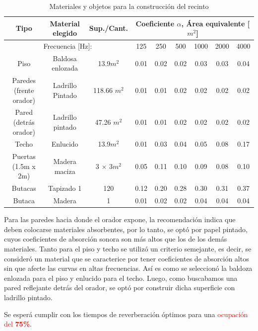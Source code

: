 \begin{table}[h]
    \centering
    \begin{tabular}{|c|c|c||c|c|c|c|c|c|} \hline
        Tipo &  Material elegido &Sup./Cant. & \multicolumn{6}{|c|}{Coeficiente $\alpha$, Área equivalente [$m^2$]} \\ \hline
        \multicolumn{3}{|c|}{Frecuencia [Hz]:} & 125 & 250 & 500 & 1000 & 2000 & 4000 \\ \hline \hline
        Piso & Baldosa enlozada & 13.9$m^2$ & 0.01 & 0.02 & 0.02 & 0.03 & 0.03 & 0.04 \\ \hline
        Paredes (frente orador) & Ladrillo Pintado & 118.66 $m^2$ & 0.01 & 0.01 & 0.02 & 0.02 & 0.02 & 0.02 \\ \hline
        Pared (detrás orador) & Ladrillo pintado & 47.26 $m^2$ & 0.01 & 0.01 & 0.02 & 0.02 & 0.02 & 0.02 \\ \hline
        Techo & Enlucido &13.9$m^2$ & 0.01 & 0.03 & 0.04 & 0.05 & 0.08 & 0.17 \\ \hline
        Puertas (1.5m x 2m) & Madera maciza & 3 $\times$ 3$m^2$ & 0.05 & 0.11 & 0.10 & 0.09 & 0.08 &  0.10 \\ \hline \hline
        Butacas & Tapizado 1 & 120 & 0.12 & 0.20 & 0.28 & 0.30 & 0.31 & 0.37 \\ \hline
        Butaca & Madera & 1 & 0.01 & 0.02 & 0.02 & 0.04 & 0.04 & 0.04 \\ \hline
    \end{tabular}
    \caption{Materiales y objetos para la construcción del recinto}
    \label{tab:materiales_construccion_recinto}
\end{table}

\par Para las paredes hacia donde el orador expone, la recomendación indica que deben colocarse materiales absorbentes, por lo tanto, se optó por papel pintado, cuyos coeficientes de absorción sonora son más altos que los de los demás materiales. Tanto para el piso y techo se utilizó un criterio semejante, es decir, se consideró un material que se caracterice por tener coeficientes de absorción altos sin que afecte las curvas en altas frecuencias. Así es como se seleccionó la baldoza enlozada para el piso y enlucido para el techo. Luego, como buscabamos una pared reflejante detrás del orador, se optó por construir dicha superficie con ladrillo pintado.

\par Se esperá cumplir con los tiempos de reverberación óptimos para una  \textcolor{red}{ocupación del \textbf{75\%}}.\\

